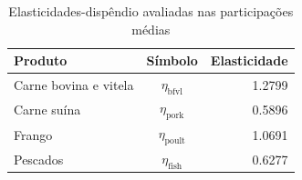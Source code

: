
\begin{table}[H]
\centering
\caption{Elasticidades-dispêndio avaliadas nas participações médias}
\label{tab:elasticidade-dispendio-dup}
\small
\begin{tabular}{@{}lcr@{}}
\toprule
Produto & Símbolo & Elasticidade \\
\midrule
Carne bovina e vitela & $\eta_{\text{bfvl}}$ & 1.2799 \\
Carne suína & $\eta_{\text{pork}}$ & 0.5896 \\
Frango & $\eta_{\text{poult}}$ & 1.0691 \\
Pescados & $\eta_{\text{fish}}$ & 0.6277 \\
\bottomrule
\end{tabular}
\end{table}
